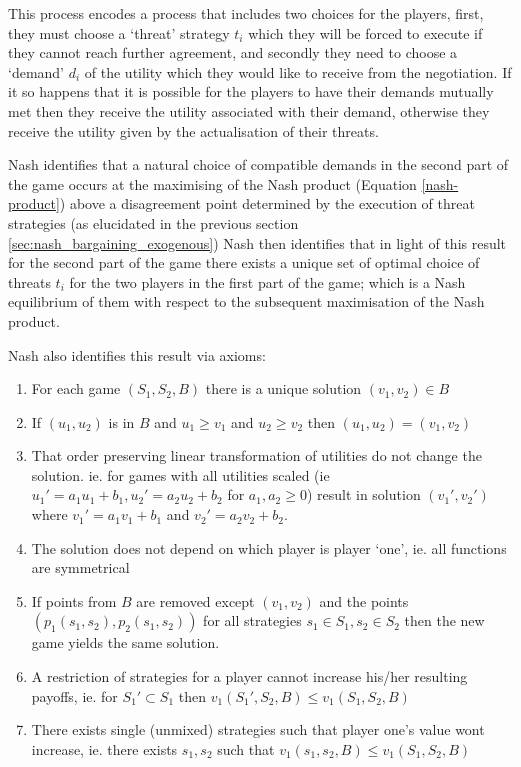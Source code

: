 This process encodes a process that includes two choices for the players, first, they must choose a `threat' strategy $t_i$ which they will be forced to execute if they cannot reach further agreement, and secondly they need to choose a `demand' $d_i$ of the utility which they would like to receive from the negotiation.
If it so happens that it is possible for the players to have their demands mutually met then they receive the utility associated with their demand, otherwise they receive the utility given by the actualisation of their threats.

Nash identifies that a natural choice of compatible demands in the second part of the game occurs at the maximising of the Nash product (Equation \ref{nash-product}) above a disagreement point determined by the execution of threat strategies (as elucidated in the previous section \ref{sec:nash_bargaining_exogenous})
Nash then identifies that in light of this result for the second part of the game there exists a unique set of optimal choice of threats $t_i$ for the two players in the first part of the game; which is a Nash equilibrium of them with respect to the subsequent maximisation of the Nash product.

Nash also identifies this result via axioms:
\begin{enumerate}
\item For each game $(S_1,S_2,B)$ there is a unique solution $(v_1,v_2) \in B$
\item If $(u_1,u_2)$ is in $B$ and $u_1\ge v_1$ and $u_2\ge v_2$ then $(u_1,u_2)=(v_1,v_2)$
\item That order preserving linear transformation of utilities do not change the solution. ie. for games with all utilities scaled (ie $u_1' = a_1u_1+b_1, u_2' = a_2u_2+b_2$ for $a_1,a_2\ge 0$) result in solution $(v_1',v_2')$ where $v_1'=a_1v_1+b_1$ and $v_2'=a_2v_2+b_2$.
\item The solution does not depend on which player is player `one', ie. all functions are symmetrical
\item If points from $B$ are removed except $(v_1,v_2)$ and the points $(p_1(s_1,s_2), p_2(s_1,s_2))$ for all strategies $s_1\in S_1,s_2\in S_2$ then the new game yields the same solution.
\item A restriction of strategies for a player cannot increase his/her resulting payoffs, ie. for $S_1'\subset S_1$ then $v_1(S_1',S_2,B)\le v_1(S_1,S_2,B)$
\item There exists single (unmixed) strategies such that player one's value wont increase, ie. there exists $s_1,s_2$ such that $v_1(s_1,s_2,B)\le v_1(S_1,S_2,B)$
\end{enumerate}

